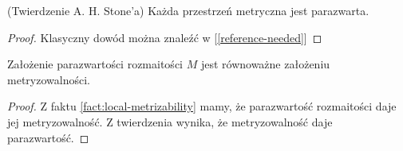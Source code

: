 \begin{thm}(Twierdzenie A. H. Stone'a)
  \label{thm:stone}
  Każda przestrzeń metryczna jest parazwarta.
  \begin{proof}
    Klasyczny dowód można znaleźć w [\ref{reference-needed}]
  \end{proof}
\end{thm}

\begin{cor}
  Założenie parazwartości rozmaitości $M$ jest równoważne założeniu metryzowalności.
  \begin{proof}
    Z faktu \ref{fact:local-metrizability} mamy, że parazwartość rozmaitości daje jej metryzowalność. Z twierdzenia \label{thm:stone} wynika, że metryzowalność daje parazwartość.
  \end{proof}
\end{cor}
